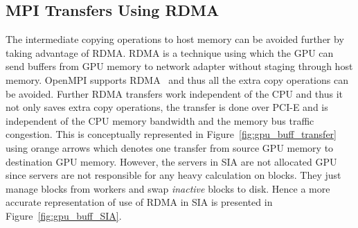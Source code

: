 \subsection{MPI Transfers Using RDMA}
The intermediate copying operations to host memory can be avoided further by
taking advantage of RDMA. RDMA is a technique using
which the GPU can send buffers from GPU memory to network adapter without staging
through host memory. OpenMPI supports RDMA~\cite{openmpi-cudaaware} and thus all
the extra copy operations can be avoided.
Further RDMA transfers work independent of the CPU and thus it not only saves
extra copy operations, the transfer is done over PCI-E and is independent
of the CPU memory bandwidth and the memory bus traffic congestion.
This is conceptually represented in Figure~\ref{fig:gpu_buff_transfer} using orange
arrows which denotes one transfer from source GPU memory to destination GPU memory.
However, the servers in SIA are not allocated GPU since servers are not responsible
for any heavy calculation on blocks. They just manage blocks from workers and
swap \textit{inactive} blocks to disk. Hence a more accurate representation of
use of RDMA in SIA is presented in Figure~\ref{fig:gpu_buff_SIA}.

